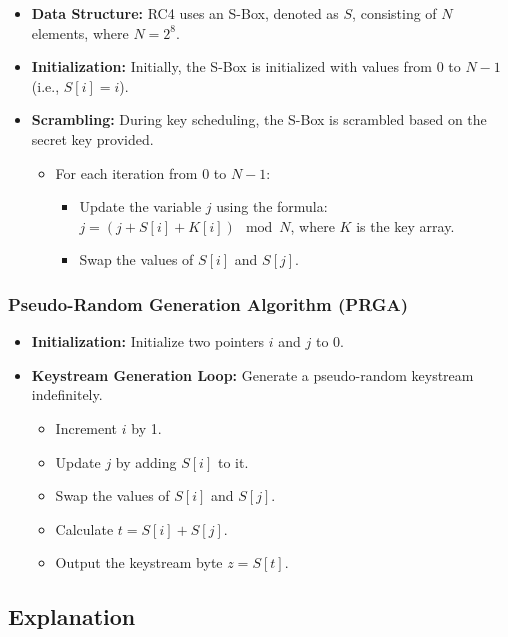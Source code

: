 \documentclass[11pt]{article}
\begin{document}
\begin{itemize}
    \item \textbf{Data Structure:} RC4 uses an S-Box, denoted as \( S \), consisting of \( N \) elements, where \( N = 2^8 \).
    \item \textbf{Initialization:} Initially, the S-Box is initialized with values from 0 to \( N-1 \) (i.e., \( S[i] = i \)).
    \item \textbf{Scrambling:} During key scheduling, the S-Box is scrambled based on the secret key provided.
    \begin{itemize}
        \item For each iteration from 0 to \( N-1 \):
        \begin{itemize}
            \item Update the variable \( j \) using the formula: \( j = (j + S[i] + K[i]) \mod N \), where \( K \) is the key array.
            \item Swap the values of \( S[i] \) and \( S[j] \).
        \end{itemize}
    \end{itemize}
\end{itemize}

\subsubsection{Pseudo-Random Generation Algorithm (PRGA)}

\begin{itemize}
    \item \textbf{Initialization:} Initialize two pointers \( i \) and \( j \) to 0.
    \item \textbf{Keystream Generation Loop:} Generate a pseudo-random keystream indefinitely.
    \begin{itemize}
        \item Increment \( i \) by 1.
        \item Update \( j \) by adding \( S[i] \) to it.
        \item Swap the values of \( S[i] \) and \( S[j] \).
        \item Calculate \( t = S[i] + S[j] \).
        \item Output the keystream byte \( z = S[t] \).
    \end{itemize}
\end{itemize}

\subsection{Explanation}
\end{document}
